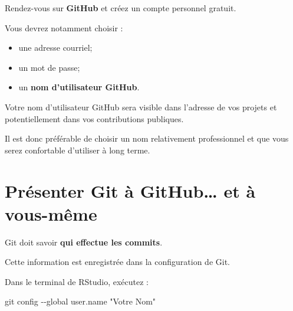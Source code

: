 \documentclass[
  letterpaper,
  DIV=11,
  numbers=noendperiod]{scrreprt}
\newenvironment{Shaded}{\begin{snugshade}}{\end{snugshade}}
\newcommand{\AttributeTok}[1]{\textcolor[rgb]{0.40,0.45,0.13}{#1}}
\newcommand{\FunctionTok}[1]{\textcolor[rgb]{0.28,0.35,0.67}{#1}}
\newcommand{\NormalTok}[1]{\textcolor[rgb]{0.00,0.23,0.31}{#1}}
\newcommand{\StringTok}[1]{\textcolor[rgb]{0.13,0.47,0.30}{#1}}
\providecommand{\tightlist}{%
  \setlength{\itemsep}{0pt}\setlength{\parskip}{0pt}}\usepackage{longtable,booktabs,array}
\begin{document}

Rendez-vous sur \textbf{GitHub} et créez un compte personnel gratuit.

Vous devrez notamment choisir :

\begin{itemize}
\tightlist
\item
  une adresse courriel;
\item
  un mot de passe;
\item
  un \textbf{nom d'utilisateur GitHub}.
\end{itemize}

\begin{tcolorbox}[enhanced jigsaw, arc=.35mm, title=\textcolor{quarto-callout-important-color}{\faExclamation}\hspace{0.5em}{Choisissez bien votre nom d'utilisateur}, colback=white, left=2mm, rightrule=.15mm, toptitle=1mm, opacityback=0, bottomtitle=1mm, breakable, colframe=quarto-callout-important-color-frame, coltitle=black, toprule=.15mm, titlerule=0mm, opacitybacktitle=0.6, bottomrule=.15mm, colbacktitle=quarto-callout-important-color!10!white, leftrule=.75mm]

Votre nom d'utilisateur GitHub sera visible dans l'adresse de vos
projets et potentiellement dans vos contributions publiques.

Il est donc préférable de choisir un nom relativement professionnel et
que vous serez confortable d'utiliser à long terme.

\end{tcolorbox}


\chapter{Présenter Git à GitHub\ldots{} et à
vous-même}\label{pruxe9senter-git-uxe0-github-et-uxe0-vous-muxeame}

Git doit savoir \textbf{qui effectue les commits}.

Cette information est enregistrée dans la configuration de Git.

Dans le terminal de RStudio, exécutez :

\begin{Shaded}
\begin{Highlighting}[]
\FunctionTok{git}\NormalTok{ config }\AttributeTok{{-}{-}global}\NormalTok{ user.name }\StringTok{"Votre Nom"}
\end{Highlighting}
\end{Shaded}
\end{document}
